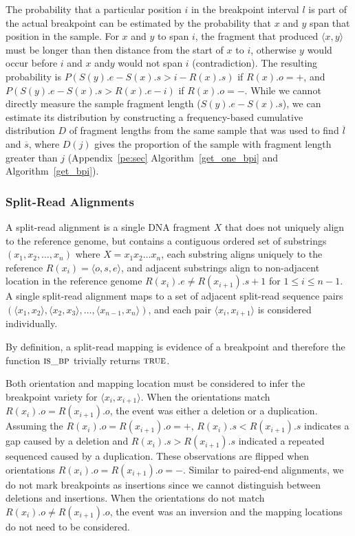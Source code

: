 \documentclass[10pt]{bmc_article}
\newenvironment{bmcformat}{\begin{raggedright}\baselineskip20pt\sloppy\setboolean{publ}{false}}{\end{raggedright}\baselineskip20pt\sloppy}
\begin{document}
\begin{bmcformat}
The probability that a particular position $i$ in the breakpoint interval $l$ is
part of the actual breakpoint can be estimated by the probability that $x$ and
$y$ span that position in the sample. For $x$ and $y$ to span $i$, the fragment
that produced $\langle x,y \rangle$ must be longer than then distance from the
start of $x$ to $i$, otherwise $y$ would occur before $i$ and $x$ and$y$ would
not span $i$ (contradiction).  The resulting probability is
$P(S(y).e - S(x).s > i - R(x).s)$ if $R(x).o=+$, and
$P(S(y).e - S(x).s > R(x).e - i)$ if $R(x).o=-$.
While we cannot directly measure the sample fragment length ($S(y).e - S(x).s$),
we can estimate its distribution by constructing a frequency-based cumulative
distribution $D$ of fragment lengths from the same sample that was used to find
$\overline{l}$ and $\overline{s}$, where $D(j)$ gives the proportion of the
sample with fragment length greater than $j$ (Appendix~\ref{pe:sec}
Algorithm~\ref{get_one_bpi} and Algorithm~\ref{get_bpi}).

\subsubsection*{Split-Read Alignments}

A split-read alignment is a single DNA fragment $X$ that does not uniquely align
to the reference genome, but contains a contiguous ordered set of substrings
$(x_1, x_2, \dots, x_n)$ where $X=x_1x_2\dots x_n$, each substring aligns
uniquely to the reference $R(x_i)=\langle o,s,e \rangle$, and adjacent
substrings align to non-adjacent location in the reference genome
$R(x_{i}).e \neq R(x_{i+1}).s + 1$ for $1\leq i \leq n-1$. A single split-read
alignment maps to a set of adjacent split-read sequence pairs
$(\langle x_1 , x_2 \rangle, \langle x_2, x_3 \rangle, \dots ,
\langle x_{n-1},x_n \rangle)$, and each pair $\langle x_i,x_{i+1} \rangle$ is
considered individually.

By definition, a split-read mapping is evidence of a breakpoint and therefore
the function $\textsc{is\_bp}$ trivially returns $\textsc{true}$.

Both orientation and mapping location must be considered to infer the breakpoint
variety for $\langle x_i,x_{i+1} \rangle$.  When the orientations match
$R(x_{i}).o=R(x_{i+1}).o$, the event was either a deletion or
a duplication.  Assuming the $R(x_{i}).o=R(x_{i+1}).o=+$,
$R(x_{i}).s<R(x_{i+1}).s$ indicates a gap caused by a deletion and
$R(x_{i}).s>R(x_{i+1}).s$ indicated a repeated sequenced caused by a
duplication.   These observations are flipped when orientations
$R(x_{i}).o=R(x_{i+1}).o=-$.  Similar to paired-end alignments, we do not mark
breakpoints as insertions since we cannot distinguish between deletions
and insertions.  When the orientations do not match $R(x_{i}).o \ne
R(x_{i+1}).o$, the event was an inversion and the mapping locations do not need
to be considered.


\end{bmcformat}
\end{document}
